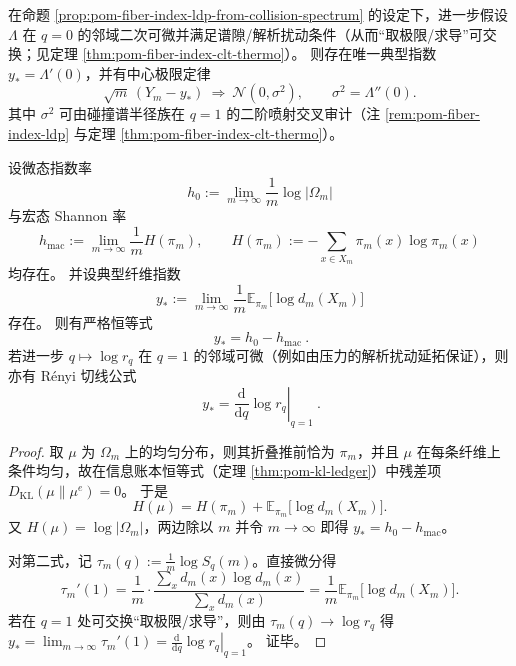 \begin{corollary}\label{cor:pom-fiber-index-clt-variance-certificate}
在命题 \ref{prop:pom-fiber-index-ldp-from-collision-spectrum} 的设定下，进一步假设 \(\Lambda\) 在 \(q=0\) 的邻域二次可微并满足谱隙/解析扰动条件（从而“取极限/求导”可交换；见定理 \ref{thm:pom-fiber-index-clt-thermo}）。
则存在唯一典型指数 \(y_\ast=\Lambda'(0)\)，并有中心极限定律
\[
\sqrt{m}\,(Y_m-y_\ast)\ \Longrightarrow\ \mathcal N(0,\sigma^2),
\qquad
\sigma^2=\Lambda''(0).
\]
其中 \(\sigma^2\) 可由碰撞谱半径族在 \(q=1\) 的二阶喷射交叉审计（注 \ref{rem:pom-fiber-index-ldp} 与定理 \ref{thm:pom-fiber-index-clt-thermo}）。
\end{corollary}

\begin{proposition}[纤维典型指数的 Rényi 切线公式：\texorpdfstring{$q=1$}{q=1} 处导数即平均信息损失率]\label{prop:pom-typical-fiber-exponent-renyi-tangent}
设微态指数率
\[
h_0:=\lim_{m\to\infty}\frac{1}{m}\log|\Omega_m|
\]
与宏态 Shannon 率
\[
h_{\mathrm{mac}}:=\lim_{m\to\infty}\frac{1}{m}H(\pi_m),
\qquad
H(\pi_m):=-\sum_{x\in X_m}\pi_m(x)\log\pi_m(x)
\]
均存在。
并设典型纤维指数
\[
y_\ast:=\lim_{m\to\infty}\frac{1}{m}\mathbb{E}_{\pi_m}\!\bigl[\log d_m(X_m)\bigr]
\]
存在。
则有严格恒等式
\[
\boxed{\ y_\ast=h_0-h_{\mathrm{mac}}\ }.
\]
若进一步 \(q\mapsto \log r_q\) 在 \(q=1\) 的邻域可微（例如由压力的解析扰动延拓保证），则亦有 Rényi 切线公式
\[
\boxed{\ y_\ast=\left.\frac{\mathrm d}{\mathrm dq}\log r_q\right|_{q=1}\ }.
\]
\end{proposition}
\begin{proof}
取 \(\mu\) 为 \(\Omega_m\) 上的均匀分布，则其折叠推前恰为 \(\pi_m\)，并且 \(\mu\) 在每条纤维上条件均匀，故在信息账本恒等式（定理 \ref{thm:pom-kl-ledger}）中残差项 \(D_{\mathrm{KL}}(\mu\|\mu^{e})=0\)。
于是
\[
H(\mu)=H(\pi_m)+\mathbb{E}_{\pi_m}\!\bigl[\log d_m(X_m)\bigr].
\]
又 \(H(\mu)=\log|\Omega_m|\)，两边除以 \(m\) 并令 \(m\to\infty\) 即得 \(y_\ast=h_0-h_{\mathrm{mac}}\)。
\par
对第二式，记 \(\tau_m(q):=\frac{1}{m}\log S_q(m)\)。直接微分得
\[
\tau_m'(1)=\frac{1}{m}\cdot\frac{\sum_{x}d_m(x)\log d_m(x)}{\sum_x d_m(x)}
=\frac{1}{m}\mathbb{E}_{\pi_m}\!\bigl[\log d_m(X_m)\bigr].
\]
若在 \(q=1\) 处可交换“取极限/求导”，则由 \(\tau_m(q)\to \log r_q\) 得
\(
y_\ast=\lim_{m\to\infty}\tau_m'(1)=\left.\frac{\mathrm d}{\mathrm dq}\log r_q\right|_{q=1}
\)。
证毕。
\end{proof}

